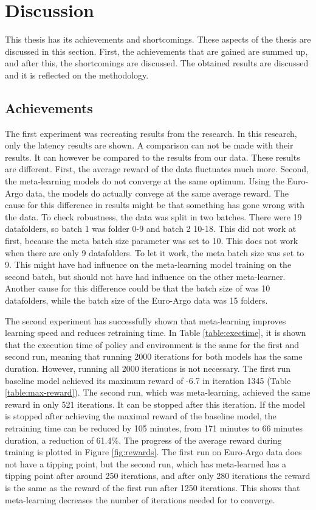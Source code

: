 \chapter{Discussion}\label{sec:discussion}

This thesis has its achievements and shortcomings. These aspects of the thesis
are discussed in this section. First, the achievements that are gained are
summed up, and after this, the shortcomings are discussed. The obtained
results are discussed and it is reflected on the methodology.

\section{Achievements}

The first experiment was recreating results from the \mrlco research. In this
research, only the latency results are shown. A comparison can not be made
with their results. It can however be compared to the results from our data.
These results are different. First, the average reward of the \mrlco data
fluctuates much more. Second, the meta-learning models do not converge at the
same optimum. Using the Euro-Argo data, the models do actually convege at the
same average reward. The cause for this difference in results might be that
something has gone wrong with the \mrlco data. To check robustness, the data
was split in two batches. There were 19 datafolders, so batch 1 was folder
0-9 and batch 2 10-18. This did not work at first, because the meta batch size
parameter was set to 10. This does not work when there are only 9 datafolders.
To let it work, the meta batch size was set to 9. This might have had
influence on the meta-learning model training on the second batch, but should
not have had influence on the other meta-learner. Another cause for this
difference could be that the batch size of \mrlco was 10 datafolders, while
the batch size of the Euro-Argo data was 15 folders.

The second experiment has successfully shown that meta-learning improves
learning speed and reduces retraining time. In Table \ref{table:exectime}, it
is shown that the execution time of policy and environment is the same for the
first and second run, meaning that running 2000 iterations for both models has
the same duration. However, running all 2000 iterations is not necessary. The
first run baseline model achieved its maximum reward of -6.7 in iteration 1345
(Table \ref{table:max-reward}). The second run, which was meta-learning,
achieved the same reward in only 521 iterations. It can be stopped after this
iteration. If the model is stopped after achieving the maximal reward of the
baseline model, the retraining time can be reduced by 105 minutes, from 171
minutes to 66 minutes duration, a reduction of 61.4\%. The progress of the
average reward during training is plotted in Figure \ref{fig:rewards}. The
first run on Euro-Argo data does not have a tipping point, but the second run,
which has meta-learned has a tipping point after around 250 iterations, and
after only 280 iterations the reward is the same as the reward of the first
run after 1250 iterations. This shows that meta-learning decreases the number
of iterations needed for \mrlco to converge.

